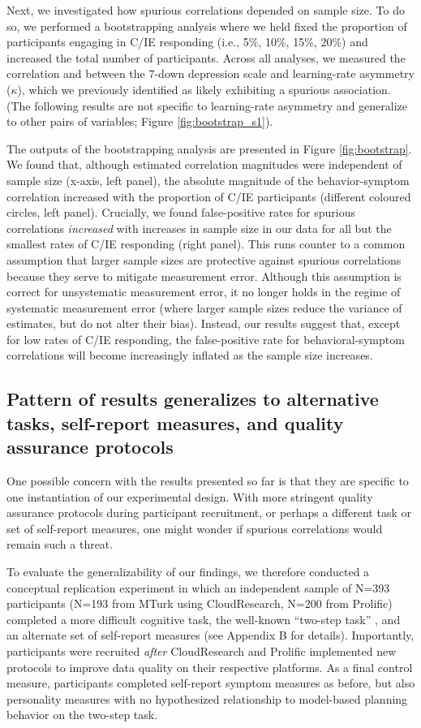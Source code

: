 \documentclass[a4paper,notitlepage,12pt]{article}
\begin{document}
\begin{refsection}[main]
Next, we investigated how spurious correlations depended on sample size. To do so, we performed a bootstrapping analysis where we held fixed the proportion of participants engaging in C/IE responding (i.e., 5\%, 10\%, 15\%, 20\%) and increased the total number of participants. Across all analyses, we measured the correlation and between the 7-down depression scale and learning-rate asymmetry ($\kappa$), which we previously identified as likely exhibiting a spurious association. (The following results are not specific to learning-rate asymmetry and generalize to other pairs of variables; Figure \ref{fig:bootstrap_s1}).  

The outputs of the bootstrapping analysis are presented in Figure \ref{fig:bootstrap}. We found that, although estimated correlation magnitudes were independent of sample size (x-axis, left panel), the absolute magnitude of the behavior-symptom correlation increased with the proportion of C/IE participants (different coloured circles, left panel). Crucially, we found false-positive rates for spurious correlations \emph{increased} with increases in sample size in our data for all but the smallest rates of C/IE responding (right panel). This runs counter to a common assumption that larger sample sizes are protective against spurious correlations because they serve to mitigate measurement error. Although this assumption is correct for unsystematic measurement error, it no longer holds in the regime of systematic measurement error (where larger sample sizes reduce the variance of estimates, but do not alter their bias). Instead, our results suggest that, except for low rates of C/IE responding, the false-positive rate for behavioral-symptom correlations will become increasingly inflated as the sample size increases.

\subsection*{Pattern of results generalizes to alternative tasks, self-report measures, and quality assurance protocols}

One possible concern with the results presented so far is that they are specific to one instantiation of our experimental design. With more stringent quality assurance protocols during participant recruitment, or perhaps a different task or set of self-report measures, one might wonder if spurious correlations would remain such a threat.

To evaluate the generalizability of our findings, we therefore conducted a conceptual replication experiment in which an independent sample of N=393 participants (N=193 from MTurk using CloudResearch, N=200 from Prolific) completed a more difficult cognitive task, the well-known ``two-step task'' \cite{daw2011model}, and an alternate set of self-report measures (see Appendix B for details). Importantly, participants were recruited \textit{after} CloudResearch and Prolific implemented new protocols to improve data quality on their respective platforms. As a final control measure, participants completed self-report symptom measures as before, but also personality measures with no hypothesized relationship to model-based planning behavior on the two-step task. 


\end{refsection}
\end{document}
